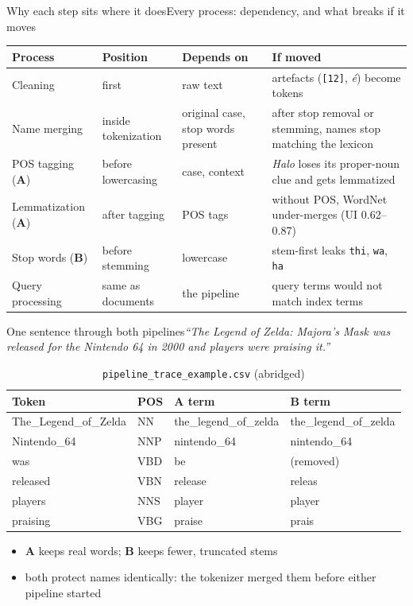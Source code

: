 \documentclass[
  aspectratio=169,
  10pt,
  t,
]{beamer}
\newcommand{\A}{\textcolor{pipeA}{\textbf{A}}}
\newcommand{\B}{\textcolor{pipeB}{\textbf{B}}}
\newcommand{\pA}[1]{\textcolor{pipeA}{#1}}
\newcommand{\pB}[1]{\textcolor{pipeB}{#1}}
\newcommand{\muted}[1]{\textcolor{muted}{#1}}
\begin{document}
\begin{frame}{Why each step sits where it does}{Every process: dependency, and what breaks if it moves}
\begin{table}
\footnotesize
\begin{tabular}{p{}p{}p{}p{}}
\toprule
Process & Position & Depends on & If moved \\
\midrule
Cleaning & first & raw text & artefacts (\texttt{[12]}, \emph{é}) become tokens \\
Name merging & inside tokenization & original case, stop words present & after stop removal or stemming, names stop matching the lexicon \\
POS tagging (\A) & before lowercasing & case, context & \emph{Halo} loses its proper-noun clue and gets lemmatized \\
Lemmatization (\A) & after tagging & POS tags & without POS, WordNet under-merges (UI 0.62--0.87) \\
Stop words (\B) & before stemming & lowercase & stem-first leaks \texttt{thi}, \texttt{wa}, \texttt{ha} \\
Query processing & same as documents & the pipeline & query terms would not match index terms \\
\bottomrule
\end{tabular}
\end{table}
\end{frame}

\begin{frame}{One sentence through both pipelines}{\emph{``The Legend of Zelda: Majora's Mask was released for the Nintendo 64 in 2000 and players were praising it.''}}
\begin{table}
\footnotesize
\begin{tabular}{llll}
\toprule
Token & POS & \A{} term & \B{} term \\
\midrule
The\_Legend\_of\_Zelda & NN & the\_legend\_of\_zelda & the\_legend\_of\_zelda \\
Nintendo\_64 & NNP & nintendo\_64 & nintendo\_64 \\
was & VBD & \pA{be} & \muted{(removed)} \\
released & VBN & \pA{release} & \pB{releas} \\
players & NNS & player & player \\
praising & VBG & \pA{praise} & \pB{prais} \\
\bottomrule
\end{tabular}
\caption{\texttt{pipeline\_trace\_example.csv} (abridged)}
\end{table}
\begin{itemize}
  \item \A{} keeps \alert{real words}; \B{} keeps fewer, truncated stems
  \item both protect \alert{names identically}: the tokenizer merged them before either pipeline started
\end{itemize}
\end{frame}
\end{document}
